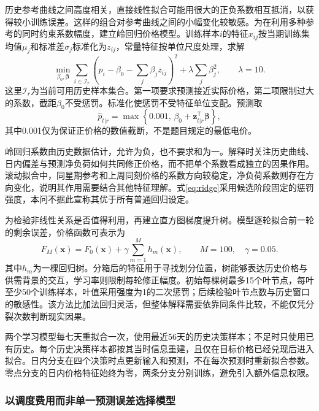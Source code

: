\documentclass[11pt,a4paper]{article}
\begin{document}
历史参考曲线之间高度相关，直接线性拟合可能用很大的正负系数相互抵消，以获得较小训练误差。这样的组合对参考曲线之间的小幅变化较敏感。为在利用多种参考的同时约束系数幅度，建立岭回归价格模型\cite{hoerl}。训练样本$i$的特征$x_{ij}$按当期训练集均值$\mu_j$和标准差$\sigma_j$标准化为$z_{ij}$，常量特征按单位尺度处理，求解
\begin{equation}
 \min_{\beta_0,\boldsymbol\beta}
 \sum_{i\in\mathcal I_r}\left(p_i-\beta_0-\sum_j\beta_jz_{ij}\right)^2
 +\lambda\sum_j\beta_j^2,\qquad \lambda=10.
 \label{eq:ridge}
\end{equation}
这里$\mathcal I_r$为当前可用历史样本集合。第一项要求预测接近实际价格，第二项限制过大的系数，截距$\beta_0$不受惩罚。标准化使惩罚不受特征单位支配。预测取
\begin{equation}
 \widehat p_{t|r}=\max\left\{0.001,\,\beta_0+\boldsymbol z_{t|r}^{\mathsf T}\boldsymbol\beta\right\},
\end{equation}
其中0.001仅为保证正价格的数值截断，不是题目规定的最低电价。

岭回归系数由历史数据估计，允许为负，也不要求和为一。解释时关注历史曲线、日内偏差与预测净负荷如何共同修正价格，而不把单个系数看成独立的因果作用。滚动拟合中，同星期参考和上周同刻价格的系数方向较稳定，净负荷系数则存在方向变化，说明其作用需要结合其他特征理解。式\eqref{eq:ridge}采用候选阶段固定的惩罚强度，本问不据此宣称其优于所有普通回归设定。

为检验非线性关系是否值得利用，再建立直方图梯度提升树\cite{friedman}。模型逐轮拟合前一轮的剩余误差，价格函数可表示为
\begin{equation}
 F_M(\boldsymbol x)=F_0(\boldsymbol x)+\gamma\sum_{m=1}^{M}h_m(\boldsymbol x),
 \qquad M=100,\quad\gamma=0.05.
\end{equation}
其中$h_m$为一棵回归树。分箱后的特征用于寻找划分位置，树能够表达历史价格与供需背景的交互，学习率则限制每轮修正幅度。初始每棵树最多15个叶节点，每叶至少50个训练样本，叶值采用强度为1的二次惩罚；后续检验叶节点数与历史窗口的敏感性。该方法比加法回归灵活，但整体解释需要依靠同条件比较，不能仅凭分裂次数判断现实因果。

两个学习模型每七天重拟合一次，使用最近56天的历史决策样本；不足时只使用已有历史。每个历史决策样本都按其当时信息重建，且仅在目标价格已经兑现后进入拟合。日内分支在四个决策时点更新输入和预测，不在每次预测时重新拟合参数。零点分支的日内价格特征始终为零，两条分支分别训练，避免引入额外信息权限。

\subsubsection{以调度费用而非单一预测误差选择模型}
\end{document}

